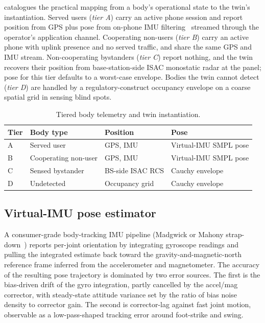 \documentclass[journal,twocolumn,10pt]{IEEEtran}
\theoremstyle{plain}
\theoremstyle{remark}
\begin{document}
 catalogues the practical mapping from a body's
operational state to the twin's instantiation. Served users
(\emph{tier A}) carry an active phone session and report position
from GPS plus pose from on-phone IMU
filtering~\cite{Madgwick2011} streamed through the operator's
application channel. Cooperating non-users (\emph{tier B}) carry an
active phone with uplink presence and no served traffic, and share
the same GPS and IMU stream. Non-cooperating bystanders
(\emph{tier C}) report nothing, and the twin recovers their position
from base-station-side ISAC monostatic radar at the panel; pose for
this tier defaults to a worst-case envelope. Bodies the twin cannot
detect (\emph{tier D}) are handled by a regulatory-construct
occupancy envelope on a coarse spatial grid in sensing blind spots.

\begin{table}[!t]
\caption{Tiered body telemetry and twin instantiation.}
\label{tab:tiers}
\centering
\small
\begin{tabular}{@{}p{}p{}p{}p{}@{}}
\toprule
Tier & Body type & Position & Pose \\
\midrule
A & Served user & GPS, IMU & Virtual-IMU SMPL pose \\
B & Cooperating non-user & GPS, IMU & Virtual-IMU SMPL pose \\
C & Sensed bystander & BS-side ISAC RCS & Cauchy envelope \\
D & Undetected & Occupancy grid & Cauchy envelope \\
\bottomrule
\end{tabular}
\end{table}

\subsection{Virtual-IMU pose estimator}\label{sec:imu}

A consumer-grade body-tracking IMU pipeline (Madgwick or Mahony
strap-down~\cite{Madgwick2011}) reports
per-joint orientation by integrating gyroscope readings and pulling
the integrated estimate back toward the gravity-and-magnetic-north
reference frame inferred from the accelerometer and magnetometer.
The accuracy of the resulting pose trajectory is dominated by two
error sources. The first is the bias-driven drift of the gyro
integration, partly cancelled by the accel/mag corrector, with
steady-state attitude variance set by the ratio of bias noise density
to corrector gain. The second is corrector-lag against fast joint
motion, observable as a low-pass-shaped tracking error around
foot-strike and swing.
\end{document}
